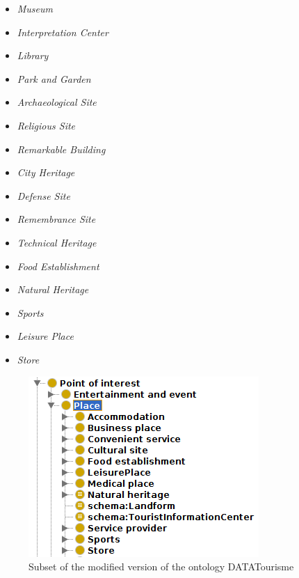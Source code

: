 \begin{minipage}[b]{0.48\linewidth}
\begin{itemize}
    \item \textit{Museum}
    \item \textit{Interpretation Center}
    \item \textit{Library}
    \item \textit{Park and Garden}
    \item \textit{Archaeological Site}
    \item \textit{Religious Site}
    \item \textit{Remarkable Building}
    \item \textit{City Heritage}
\end{itemize}
\end{minipage}
\hspace{0.1cm}
\begin{minipage}[b]{0.48\linewidth}
\begin{itemize}
    \item \textit{Defense Site}
    \item \textit{Remembrance Site}
    \item \textit{Technical Heritage}
    \item \textit{Food Establishment}
    \item \textit{Natural Heritage}
    \item \textit{Sports}
    \item \textit{Leisure Place}
    \item \textit{Store}
\end{itemize}

\end{minipage}


\begin{figure}[h]
\centering
\includegraphics[scale=0.4]{ontology.png}
\vspace{-0.3cm}
\caption{Subset of the modified version of the ontology DATATourisme
}
\label{fig:ontology}
\vspace{-0.3cm}
\end{figure}



